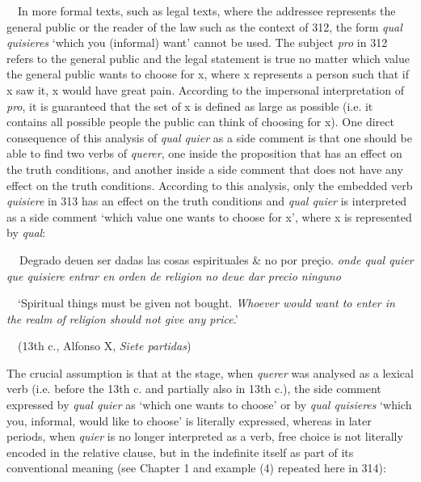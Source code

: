 \begin{styleStandard}
\ \ In more formal texts, such as legal texts, where the addressee represents the general public or the reader of the law such as the context of 312, the form \textit{qual quisieres} ‘which you (informal) want’ cannot be used. The subject \textit{pro} in 312 refers to the general public and the legal statement is true no matter which value the general public wants to choose for x, where x represents a person such that if x saw it, x would have great pain. According to the impersonal interpretation of \textit{pro}, it is guaranteed that the set of x is defined as large as possible (i.e. it contains all possible people the public can think of choosing for x). One direct consequence of this analysis of \textit{qual quier} as a side comment is that one should be able to find two verbs of \textit{querer}, one inside the proposition that has an effect on the truth conditions, and another inside a side comment that does not have any effect on the truth conditions. According to this analysis, only the embedded verb \textit{quisiere} in 313 has an effect on the truth conditions and \textit{qual quier} is interpreted as a side comment ‘which value one wants to choose for x’, where x is represented by \textit{qual}:
\end{styleStandard}

\begin{styleStandard}
\textbf{\ \ }Degrado deuen ser dadas las cosas espirituales \& no por preçio. \textit{onde qual quier que quisiere entrar en orden de religion no deue dar precio ninguno} 
\end{styleStandard}

\begin{styleStandard}
\ \ ‘Spiritual things must be given not bought. \textit{Whoever would want to enter in the realm of} \textit{religion should not give any price}.’
\end{styleStandard}

\begin{styleListParagraph}
\textmd{\ \ (13th c.,}\textmd{\textit{ }}\textmd{Alfonso X, }\textmd{\textit{Siete partidas}}\textmd{)}
\end{styleListParagraph}

\begin{styleStandard}
The crucial assumption is that at the stage, when \textit{querer} was analysed as a lexical verb (i.e. before the 13th c. and partially also in 13th c.), the side comment expressed by \textit{qual quier} as ‘which one wants to choose’ or by \textit{qual quisieres} ‘which you, informal, would like to choose’ is literally expressed, whereas in later periods, when \textit{quier} is no longer interpreted as a verb, free choice is not literally encoded in the relative clause, but in the indefinite itself as part of its conventional meaning (see Chapter 1 and example (4) repeated here in 314):
\end{styleStandard}


